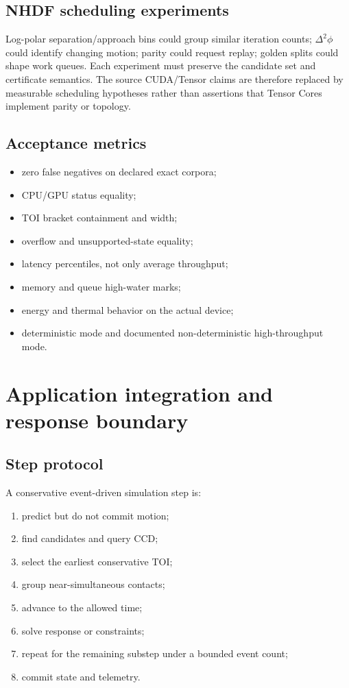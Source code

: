 \documentclass[11pt,a4paper,openany]{book}
\begin{document}
\section{NHDF scheduling experiments}
Log-polar separation/approach bins could group similar iteration counts; $\Delta^2\phi$ could identify changing motion; parity could request replay; golden splits could shape work queues. Each experiment must preserve the candidate set and certificate semantics. The source CUDA/Tensor claims are therefore replaced by measurable scheduling hypotheses rather than assertions that Tensor Cores implement parity or topology.

\section{Acceptance metrics}
\begin{itemize}
  \item zero false negatives on declared exact corpora;
  \item CPU/GPU status equality;
  \item TOI bracket containment and width;
  \item overflow and unsupported-state equality;
  \item latency percentiles, not only average throughput;
  \item memory and queue high-water marks;
  \item energy and thermal behavior on the actual device;
  \item deterministic mode and documented non-deterministic high-throughput mode.
\end{itemize}

\chapter{Application integration and response boundary}
\section{Step protocol}
A conservative event-driven simulation step is:
\begin{enumerate}
  \item predict but do not commit motion;
  \item find candidates and query CCD;
  \item select the earliest conservative TOI;
  \item group near-simultaneous contacts;
  \item advance to the allowed time;
  \item solve response or constraints;
  \item repeat for the remaining substep under a bounded event count;
  \item commit state and telemetry.
\end{enumerate}
\end{document}
